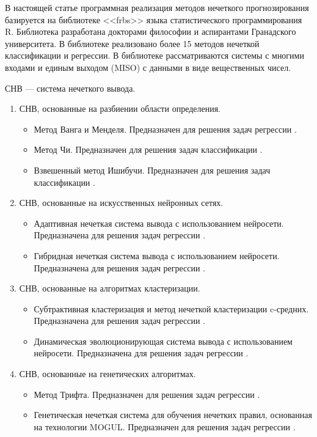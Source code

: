 В настоящей статье программная реализация методов нечеткого прогнозирования
базируется на библиотеке <<frbs>> языка статистического программирования R. Библиотека разработана докторами философии и аспирантами Гранадского университета. В библиотеке реализовано более 15 методов нечеткой классификации и регрессии. В библиотеке рассматриваются системы с многими входами и единым выходом (MISO) с данными в виде вещественных чисел.

СНВ --- система нечеткого вывода.
\begin{enumerate}
\item СНВ, основанные на разбиении области определения.
\begin{itemize}
\item Метод Ванга и Менделя. Предназначен для решения задач регрессии \cite{Wang1992}.
\item Метод Чи. Предназначен для решения задач классификации \cite{Chi1996}.
\item Взвешенный метод Ишибучи. Предназначен для решения задач классификации \cite{Ishibuchi2001}.
\end{itemize}
\item СНВ, основанные на искусственных нейронных сетях.
\begin{itemize}
	\item Адаптивная нечеткая система вывода с использованием нейросети. Предназначена для решения задач регрессии \cite{Jan1993}. 
	\item Гибридная нечеткая система вывода с использованием нейросети.  Предназначена для решения задач регрессии \cite{Kim1999}.
\end{itemize}
\item СНВ, основанные на алгоритмах кластеризации.
\begin{itemize}
	\item Субтрактивная кластеризация и метод нечеткой кластеризации c-средних.
	Предназначена для решения задач регрессии \cite{Chiu1996}.
	\item Динамическая эволюционирующая система вывода с использованием нейросети. Предназначена для решения задач регрессии \cite{Kasabov2002}.
\end{itemize}	
\item СНВ, основанные на генетических алгоритмах.
\begin{itemize}
	\item Метод Трифта. Предназначен для решения задач регрессии \cite{Thrift1991}.
	\item Генетическая нечеткая система для обучения нечетких правил, основанная на технологии MOGUL. Предназначен для решения задач регрессии \cite{Cordon1999}.

\end{itemize}
\end{enumerate}
